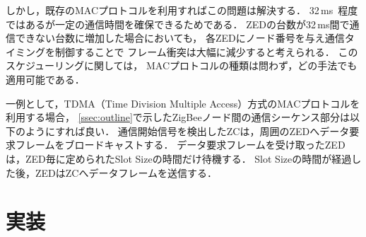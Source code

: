 \documentclass[technicalreport]{ieicej}
\begin{document}
しかし，既存のMACプロトコルを利用すればこの問題は解決する．
32\,ms~程度ではあるが一定の通信時間を確保できるためである．
ZEDの台数が32\,ms間で通信できない台数に増加した場合においても，
各ZEDにノード番号を与え通信タイミングを制御することで
フレーム衝突は大幅に減少すると考えられる．
このスケジューリングに関しては，
MACプロトコルの種類は問わず，どの手法でも適用可能である．


一例として，TDMA（Time Division Multiple Access）方式のMACプロトコルを利用する場合，
\ref{ssec:outline}で示したZigBeeノード間の通信シーケンス部分は以下のようにすれば良い．
通信開始信号を検出したZCは，周囲のZEDへデータ要求フレームをブロードキャストする．
データ要求フレームを受け取ったZEDは，ZED毎に定められたSlot Sizeの時間だけ待機する．
Slot Sizeの時間が経過した後，ZEDはZCへデータフレームを送信する．



\section{実装}
\label{sec:imple}
\end{document}
